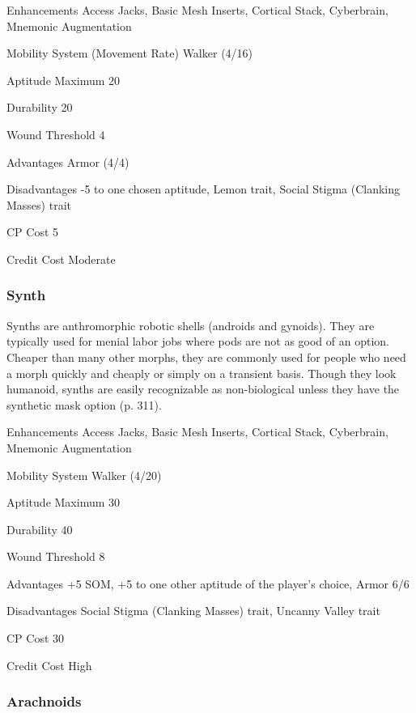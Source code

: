\begin{description*}
\item[Enhancements] Access Jacks, Basic Mesh Inserts, Cortical Stack, Cyberbrain, Mnemonic Augmentation
\item[Mobility System] (Movement Rate) Walker (4/16) 
\item[Aptitude Maximum] 20 
\item[Durability] 20 
\item[Wound Threshold] 4 
\item[Advantages] Armor (4/4) 
\item[Disadvantages] -5 to one chosen aptitude, Lemon trait, Social Stigma (Clanking Masses) trait
\item[CP Cost] 5 
\item[Credit Cost] Moderate 
\end{description*}

\subsubsection{Synth}
\label{sec:starting-synths}

Synths are anthromorphic robotic shells (androids and gynoids). They are typically used for menial labor jobs where pods are not as good of an option. Cheaper than many other morphs, they are commonly used for people who need a morph quickly and cheaply or simply on a transient basis. Though they look humanoid, synths are easily recognizable as non-biological unless they have the synthetic mask option (p. 311).

\begin{description*}
\item[Enhancements] Access Jacks, Basic Mesh Inserts, Cortical Stack, Cyberbrain, Mnemonic Augmentation
\item[Mobility System] Walker (4/20) 
\item[Aptitude Maximum] 30 
\item[Durability] 40 
\item[Wound Threshold] 8 
\item[Advantages] +5 SOM, +5 to one other aptitude of the player’s choice, Armor 6/6
\item[Disadvantages] Social Stigma (Clanking Masses) trait, Uncanny Valley trait
\item[CP Cost] 30 
\item[Credit Cost] High 
\end{description*}

\subsubsection{Arachnoids}
\label{sec:starting-arachnoids}

